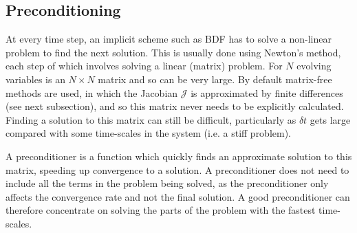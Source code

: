 \documentclass[12pt]{article}
\begin{document}
\subsection{Preconditioning}
%
At every time step, an implicit scheme such as BDF has to solve a non-linear
problem to find the next solution. This is usually done using Newton's method,
each step of which involves solving a linear (matrix) problem. For $N$ evolving
variables is an $N\times N$ matrix and so can be very large.  By default
matrix-free methods are used, in which the Jacobian $\mathcal{J}$ is
approximated by finite differences (see next subsection), and so this matrix
never needs to be explicitly calculated. Finding a solution to this matrix can
still be difficult, particularly as $\delta t$ gets large compared with some
time-scales in the system (i.e. a stiff problem).

A preconditioner is a function which quickly finds an approximate solution to
this matrix, speeding up convergence to a solution. A preconditioner does not
need to include all the terms in the problem being solved, as the
preconditioner only affects the convergence rate and not the final solution. A
good preconditioner can therefore concentrate on solving the parts of the
problem with the fastest time-scales.
\end{document}
